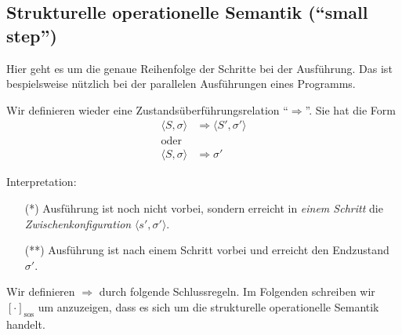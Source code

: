 \subsection{Strukturelle operationelle Semantik (``small step'')}

Hier geht es um die genaue Reihenfolge der Schritte bei der Ausführung. Das ist bespielsweise nützlich bei der parallelen Ausführungen eines Programms.

Wir definieren wieder eine Zustandsüberführungsrelation ``$\Rightarrow$''. Sie hat die Form
\begin{align*}
    \langle S, \sigma \rangle & \Rightarrow \langle S', \sigma' \rangle \tag{*} \\
    \text{oder} \\
    \langle S, \sigma \rangle & \Rightarrow \sigma' \tag{**}
\end{align*}

Interpretation:
\begin{enumerate}
    \item[(*)] Ausführung ist noch nicht vorbei, sondern erreicht in \emph{einem Schritt} die \emph{Zwischenkonfiguration} $\langle s', \sigma' \rangle$.
    \item[(**)] Ausführung ist nach einem Schritt vorbei und erreicht den Endzustand $\sigma'$.
\end{enumerate}



Wir definieren $\Rightarrow$ durch folgende Schlussregeln. Im Folgenden schreiben wir $[\cdot]_{\text{sos}}$ um anzuzeigen, dass es sich um die strukturelle operationelle Semantik handelt.


